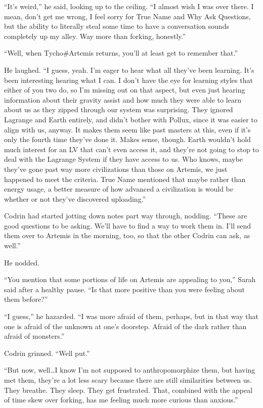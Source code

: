 ``It's weird,'' he said, looking up to the ceiling. ``I almost wish I was over there. I mean, don't get me wrong, I feel sorry for True Name and Why Ask Questions, but the ability to literally steal some time to have a conversation sounds completely up my alley. Way more than forking, honestly.''

``Well, when Tycho\#Artemis returns, you'll at least get to remember that.''

He laughed. ``I guess, yeah. I'm eager to hear what all they've been learning. It's been interesting hearing what I can. I don't have the eye for learning styles that either of you two do, so I'm missing out on that aspect, but even just hearing information about their gravity assist and how much they were able to learn about us as they zipped through our system was surprising. They ignored Lagrange and Earth entirely, and didn't bother with Pollux, since it was easier to align with us, anyway. It makes them seem like past masters at this, even if it's only the fourth time they've done it. Makes sense, though. Earth wouldn't hold much interest for an LV that can't even access it, and they're not going to stop to deal with the Lagrange System if they have access to us. Who knows, maybe they've gone past way more civilizations than those on Artemis, we just happened to meet the criteria. True Name mentioned that maybe rather than energy usage, a better measure of how advanced a civilization is would be whether or not they've discovered uploading.''

Codrin had started jotting down notes part way through, nodding. ``These are good questions to be asking. We'll have to find a way to work them in. I'll send them over to Artemis in the morning, too, so that the other Codrin can ask, as well.''

He nodded.

``You mention that some portions of life on Artemis are appealing to you,'' Sarah said after a healthy pause. ``Is that more positive than you were feeling about them before?''

``I guess,'' he hazarded. ``I was more afraid of them, perhaps, but in that way that one is afraid of the unknown at one's doorstep. Afraid of the dark rather than afraid of monsters.''

Codrin grinned. ``Well put.''

``But now, well\ldots I know I'm not supposed to anthropomorphize them, but having met them, they're a lot less scary because there are still similarities between us. They breathe. They sleep. They get frustrated. That, combined with the appeal of time skew over forking, has me feeling much more curious than anxious.''

